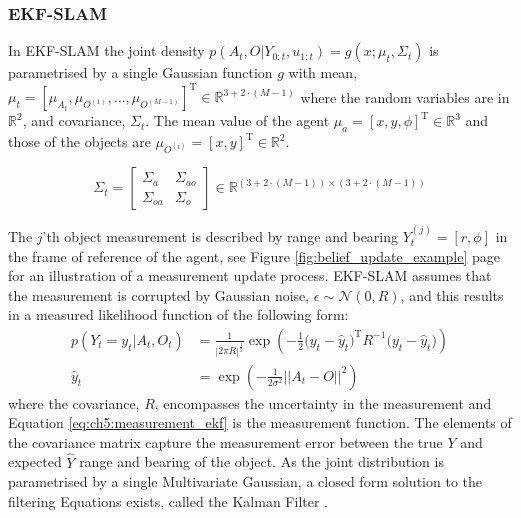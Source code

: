 \subsubsection{EKF-SLAM}\label{sec:EKF-SLAM}

In EKF-SLAM the joint density $p(A_{t},O|Y_{0:t},u_{1:t}) = g(x;\mu_t,\Sigma_t)$ is parametrised by a single Gaussian function $g$ with mean,
$\mu_t = \left[\mu_{A_{t}},\mu_{O^{(1)}},\dots,\mu_{O^{(M-1)}}\right]^{\mathrm{T}} \in \mathbb{R}^{3 + 2\cdot (M-1)}$  where the 
random variables are in $\mathbb{R}^2$, and covariance, $\Sigma_t$. The mean value of
the agent $\mu_a = [x,y,\phi]^{\mathrm{T}} \in \mathbb{R}^3$ and those of the objects are $\mu_{O^{(i)}} = [x,y]^{\mathrm{T}} \in \mathbb{R}^2$.

\begin{equation}
\Sigma_t = \begin{bmatrix}
       \Sigma_a & \Sigma_{ao}  \\[0.3em]
       \Sigma_{oa} & \Sigma_o
     \end{bmatrix}
     \in \mathbb{R}^{(3 + 2\cdot (M-1)) \times (3 + 2\cdot (M-1))}
\end{equation}

The $j$'th object measurement is described by range and bearing  $Y^{(j)}_t = [r,\phi]$ in the frame of reference of the agent,
see Figure \ref{fig:belief_update_example} page \pageref{fig:belief_update_example} for an illustration of a measurement update process.
EKF-SLAM assumes that the measurement is corrupted by Gaussian noise, $\epsilon \sim \mathcal{N}(0,R)$,
and this results in a measured likelihood function of the following form:
\begin{align} 
   p(Y_t=y_t|A_t,O_t) &= \frac{1}{|2\pi R|^{\frac{1}{2}}} \exp \left( -\frac{1}{2} \big(y_t - \hat{y}_t\big)^{\mathrm{T}}R^{-1}\big(y_t - \hat{y}_t\big) \right)\label{eq:lik-measurement}\\
   \hat{y}_t      &= \exp\left(-\frac{1}{2\sigma^2} ||A_t - O ||^2 \right)\label{eq:ch5:measurement_ekf}
\end{align}
where the covariance, $R$, encompasses the uncertainty in the measurement and Equation \ref{eq:ch5:measurement_ekf} is the measurement function. The elements of the covariance matrix capture 
the measurement error between the true $Y$ and expected $\hat{Y}$ range and bearing of the object. As the joint distribution 
is parametrised by a single Multivariate Gaussian, a closed form solution to the filtering Equations exists, called the Kalman 
Filter \cite{SLAM_part1}. 

